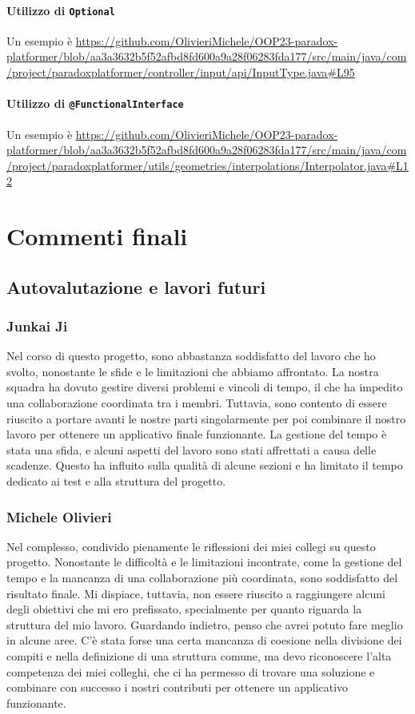 \documentclass[a4paper,12pt]{report}
\begin{document}
	\subsubsection{Utilizzo di \texttt{Optional}}
	Un esempio è
	\url{https://github.com/OlivieriMichele/OOP23-paradox-platformer/blob/aa3a3632b5f52afbd8fd600a9a28f06283fda177/src/main/java/com/project/paradoxplatformer/controller/input/api/InputType.java#L95}
	
	\subsubsection{Utilizzo di \texttt{@FunctionalInterface}}
	Un esempio è
	\url{https://github.com/OlivieriMichele/OOP23-paradox-platformer/blob/aa3a3632b5f52afbd8fd600a9a28f06283fda177/src/main/java/com/project/paradoxplatformer/utils/geometries/interpolations/Interpolator.java#L12}
	
	
	\chapter{Commenti finali}
	
	\section{Autovalutazione e lavori futuri}
	
	\subsection{Junkai Ji}
	Nel corso di questo progetto, sono abbastanza soddisfatto del lavoro che ho svolto, nonostante le sfide e le limitazioni che abbiamo affrontato. La nostra squadra ha dovuto gestire diversi problemi e vincoli di tempo, il che ha impedito una collaborazione coordinata tra i membri. Tuttavia, sono contento di essere riuscito a portare avanti le nostre parti singolarmente per poi combinare il nostro lavoro per ottenere un applicativo finale funzionante. La gestione del tempo è stata una sfida, e alcuni aspetti del lavoro sono stati affrettati a causa delle scadenze. Questo ha influito sulla qualità di alcune sezioni e ha limitato il tempo dedicato ai test e alla struttura del progetto.
	\subsection{Michele Olivieri}
	Nel complesso, condivido pienamente le riflessioni dei miei collegi su questo progetto. Nonostante le difficoltà e le limitazioni incontrate, come la gestione del tempo e la mancanza di una collaborazione più coordinata, sono soddisfatto del risultato finale. Mi dispiace, tuttavia, non essere riuscito a raggiungere alcuni degli obiettivi che mi ero prefissato, specialmente per quanto riguarda la struttura del mio lavoro. Guardando indietro, penso che avrei potuto fare meglio in alcune aree. C'è stata forse una certa mancanza di coesione nella divisione dei compiti e nella definizione di una struttura comune, ma devo riconoscere l'alta competenza dei miei colleghi, che ci ha permesso di trovare una soluzione e combinare con successo i nostri contributi per ottenere un applicativo funzionante.
\end{document}
